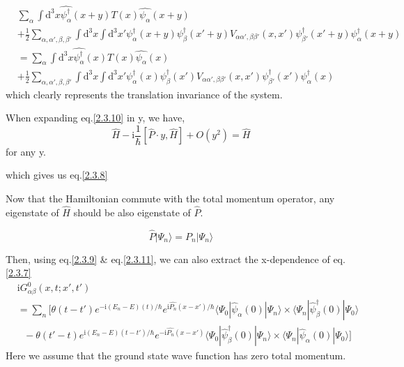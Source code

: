 \begin{align}
&\sum_{\alpha}\int \mathrm{d}^3x \hat{\psi^{\dagger}_{\alpha}}(x+y)T(x)\hat{\psi_{\alpha}}(x+y)\nonumber \\
&+\frac{1}{2}\sum_{\alpha,\alpha',\beta,\beta'}\int\mathrm{d}^3x\int\mathrm{d}^3x'\psi^{\dagger}_{\alpha}(x+y)\psi^{\dagger}_{\beta}(x'+y)V_{\alpha\alpha',\beta\beta'}(x,x')\psi^{\dagger}_{\beta'}(x'+y)\psi^{\dagger}_{\alpha}(x+y) \nonumber \\
&=\sum_{\alpha}\int \mathrm{d}^3x \hat{\psi^{\dagger}_{\alpha}}(x)T(x)\hat{\psi_{\alpha}}(x)\nonumber \\
&+\frac{1}{2}\sum_{\alpha,\alpha',\beta,\beta'}\int\mathrm{d}^3x\int\mathrm{d}^3x'\psi^{\dagger}_{\alpha}(x)\psi^{\dagger}_{\beta}(x')V_{\alpha\alpha',\beta\beta'}(x,x')\psi^{\dagger}_{\beta'}(x')\psi^{\dagger}_{\alpha}(x) \nonumber
\end{align}
which clearly represents the translation invariance of the system.

When expanding eq.\eqref{2.3.10} in y, we have, 
\begin{equation}
\hat{H}-\mathrm{i}\frac{1}{\hbar}[\hat{P}\cdot y,\hat{H}]+O(y^2)=\hat{H} \nonumber
\end{equation}
for any y.

which gives us eq.\eqref{2.3.8}

Now that the Hamiltonian commute with the total momentum operator, any eigenstate of $\hat{H}$ should be also eigenstate of $\hat{P}$.

\begin{equation}\label{2.3.11}
\hat{P}|\Psi_n\rangle=P_n|\Psi_n\rangle
\end{equation}

Then, using eq.\eqref{2.3.9} \& eq.\eqref{2.3.11}, we can also extract the x-dependence of eq.\eqref{2.3.7}
\begin{align}
&\mathrm{i}G^0_{\alpha\beta}(x,t;x',t') \nonumber \\
&=\sum_n\bigg [\theta(t-t')e^{-\mathrm{i}(E_n-E)(t)/\hbar}e^{\mathrm{i}\hat{P_n}(x-x')/\hbar}\langle\Psi_0|\hat \psi_{\alpha}(0)|\Psi_n\rangle\times\langle\Psi_n|\hat \psi^{
\dagger}_{\beta} (0)|\Psi_0\rangle \nonumber \\
& \ \ \ -\theta(t'-t)e^{\mathrm{i}(E_n-E)(t-t')/\hbar}e^{-\mathrm{i}\hat{P_n}(x-x')}\langle\Psi_0|\hat \psi^{
\dagger}_{\beta}(0)|\Psi_n\rangle\times\langle\Psi_n|\hat \psi_{\alpha} (0)|\Psi_0\rangle \bigg ] \nonumber
\end{align}
Here we assume that the ground state wave function has zero total momentum.

